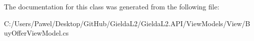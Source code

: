 The documentation for this class was generated from the following file\+:\begin{DoxyCompactItemize}
\item 
C\+:/\+Users/\+Pawel/\+Desktop/\+Git\+Hub/\+Gielda\+L2/\+Gielda\+L2.\+A\+P\+I/\+View\+Models/\+View/Buy\+Offer\+View\+Model.\+cs\end{DoxyCompactItemize}
